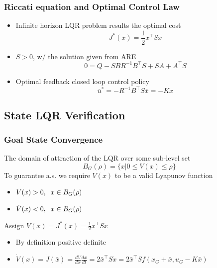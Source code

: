\documentclass{beamer}
\begin{document}

\begin{frame}
\frametitle{Riccati equation and Optimal Control Law}
\begin{itemize}
\item Infinite horizon LQR problem results the optimal cost
\begin{equation*}
J^{\ast}(\bar{x})=\frac{1}{2}\bar{x}^{\intercal}S\bar{x}
\end{equation*} 
\item $S > 0$, w/ the solution given from ARE
\begin{equation*}
0=Q-SBR^{-1}B^{\intercal}S+SA+A^{\intercal}S
\end{equation*}
\item Optimal feedback closed loop control policy 
\begin{equation*}
\bar{u}^{\ast}=-R^{-1}B^{\intercal}S\bar{x}=-Kx
\end{equation*}
\end{itemize}
\end{frame}


\subsection{State LQR Verification}

\begin{frame}
\frametitle{Goal State Convergence}
The domain of attraction of the LQR over some sub-level set
\begin{equation*}
B_G(\rho)=\{ x|0\leq V(x) \leq \rho \} 
\end{equation*} 
To guarantee a.s. we require $V(x)$ to be a valid Lyapunov function
\begin{itemize}
\item $V(x)>0, \hspace{.2cm} x\in B_G(\rho)$
\item $\dot{V}(x)<0, \hspace{.2cm} x\in B_G(\rho)$
\end{itemize}
\vspace{.4cm}
Assign $V(x)=J^{\ast}(\bar{x}) = \frac{1}{2}\bar{x}^{\intercal}S\bar{x}$
\begin{itemize}
\item By definition positive definite
\item $\dot{V}(x)=\dot{J}(\bar{x})=\frac{dV}{dx} \frac{dx}{dt} = 2\bar{x}^{\intercal}S\dot{x} = 2\bar{x}^{\intercal}Sf(x_G+\bar{x}, u_G-K\bar{x}) $
\end{itemize}
\end{frame}
\end{document}
